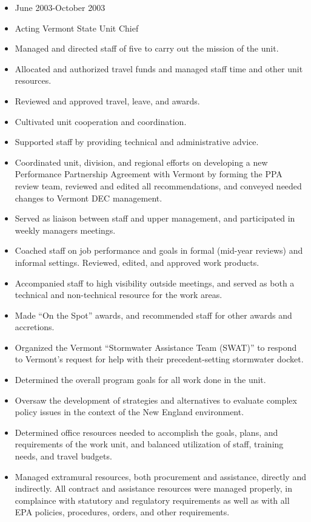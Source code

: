 \documentclass[12pt]{article}
\begin{document}
\begin{itemize}
\item
  June 2003-October 2003
\item
  Acting Vermont State Unit Chief
\item
  Managed and directed staff of five to carry out the mission of the
  unit.
\item
  Allocated and authorized travel funds and managed staff time and other
  unit resources.
\item
  Reviewed and approved travel, leave, and awards.
\item
  Cultivated unit cooperation and coordination.
\item
  Supported staff by providing technical and administrative advice.
\item
  Coordinated unit, division, and regional efforts on developing a new
  Performance Partnership Agreement with Vermont by forming the PPA
  review team, reviewed and edited all recommendations, and conveyed
  needed changes to Vermont DEC management.
\item
  Served as liaison between staff and upper management, and participated
  in weekly managers meetings.
\item
  Coached staff on job performance and goals in formal (mid-year
  reviews) and informal settings. Reviewed, edited, and approved work
  products.
\item
  Accompanied staff to high visibility outside meetings, and served as
  both a technical and non-technical resource for the work areas.
\item
  Made ``On the Spot'' awards, and recommended staff for other awards
  and accretions.
\item
  Organized the Vermont ``Stormwater Assistance Team (SWAT)'' to respond
  to Vermont's request for help with their precedent-setting stormwater
  docket.
\item Determined the overall program goals for all work done in the unit.
\item Oversaw the development of strategies and alternatives to evaluate complex policy issues in the context of the New England environment.
\item Determined office resources needed to accomplish the goals, plans, and requirements of the work unit, and balanced utilization of staff, training needs, and travel budgets.
\item
  Managed extramural resources, both procurement and assistance,
  directly and indirectly.  All contract and assistance resources were
  managed properly, in complaince with statutory and regulatory
  requirements as well as with all EPA policies, procedures, orders,
  and other requirements.

\end{itemize}
\end{document}
